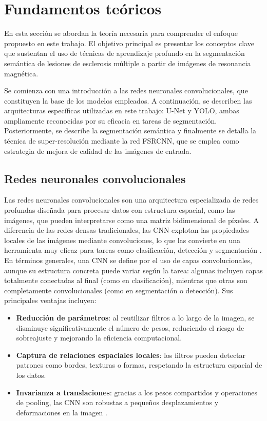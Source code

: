 \documentclass[../main.tex]{subfiles}
\begin{document}
\section{Fundamentos teóricos}
En esta sección se abordan la teoría necesaria para comprender el enfoque propuesto en este trabajo. El objetivo principal es presentar los conceptos clave que sustentan el uso de técnicas de aprendizaje profundo en la segmentación semántica de lesiones de esclerosis múltiple a partir de imágenes de resonancia magnética.

Se comienza con una introducción a las redes neuronales convolucionales, que constituyen la base de los modelos empleados. A continuación, se describen las arquitecturas específicas utilizadas en este trabajo: U-Net y YOLO, ambas ampliamente reconocidas por su eficacia en tareas de segmentación. Posteriormente, se describe la segmentación semántica y finalmente se detalla la técnica de super-resolución mediante la red  FSRCNN, que se emplea como
estrategia de mejora de calidad de las imágenes de entrada. 

\subsection{Redes neuronales convolucionales}

Las redes neuronales convolucionales son una arquitectura especializada de redes profundas diseñada para procesar datos con estructura espacial, como las imágenes, que pueden interpretarse como una matriz bidimensional de píxeles. A diferencia de las redes densas tradicionales, las CNN explotan las propiedades locales de las imágenes mediante convoluciones, lo que las convierte en una herramienta muy eficaz para tareas como clasificación, detección y segmentación \cite{Alzubaidi2021}. En términos generales, una CNN se define por el uso de capas convolucionales, aunque su estructura concreta puede variar según la tarea: algunas incluyen capas totalmente conectadas al final (como en clasificación), mientras que otras son completamente convolucionales (como en segmentación o detección). Sus principales ventajas incluyen:

\begin{itemize}
    \item \textbf{Reducción de parámetros}: al reutilizar filtros a lo largo de la imagen, se disminuye significativamente el número de pesos, reduciendo el riesgo de sobreajuste y mejorando la eficiencia computacional.
    \item \textbf{Captura de relaciones espaciales locales}: los filtros pueden detectar patrones como bordes, texturas o formas, respetando la estructura espacial de los datos.
    \item \textbf{Invarianza a translaciones}: gracias a los pesos compartidos y operaciones de pooling, las CNN son robustas a pequeños desplazamientos y deformaciones en la imagen \cite{goodfellow2016deep}.
\end{itemize}
\end{document}
